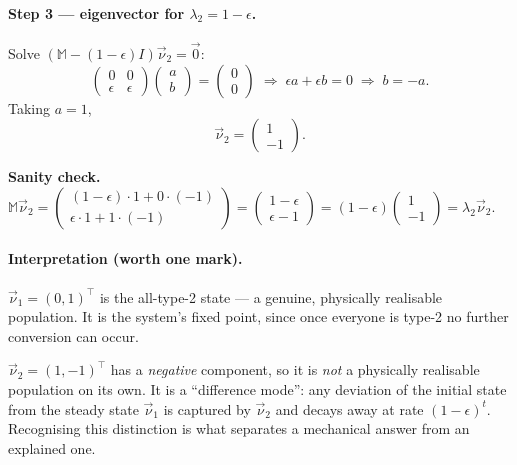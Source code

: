 \documentclass[12pt,a4paper]{article}
\newcommand{\M}{\mathbb{M}}
\newcommand{\vnu}{\vec{\nu}}
\begin{document}
\paragraph{Step 3 --- eigenvector for $\lambda_2 = 1-\epsilon$.} Solve $(\M - (1-\epsilon)I)\vnu_2 = \vec{0}$:
\[
\begin{pmatrix} 0 & 0 \\ \epsilon & \epsilon \end{pmatrix}\begin{pmatrix} a\\b \end{pmatrix} = \begin{pmatrix} 0\\0 \end{pmatrix}
\;\Longrightarrow\; \epsilon a + \epsilon b = 0 \;\Rightarrow\; b = -a.
\]
Taking $a=1$,
\[
\boxed{\vnu_2 = \begin{pmatrix} 1 \\ -1 \end{pmatrix}.}
\]
\begin{sanity}
\textbf{Sanity check.} $\M\vnu_2 = \begin{pmatrix} (1-\epsilon)\cdot 1 + 0\cdot(-1) \\ \epsilon\cdot 1 + 1\cdot(-1)\end{pmatrix} = \begin{pmatrix} 1-\epsilon\\ \epsilon-1\end{pmatrix} = (1-\epsilon)\begin{pmatrix} 1\\-1\end{pmatrix} = \lambda_2\vnu_2$. \checkmark
\end{sanity}

\paragraph{Interpretation (worth one mark).}
$\vnu_1 = (0,1)^{\top}$ is the all-type-2 state --- a genuine, physically realisable population. It is the system's fixed point, since once everyone is type-2 no further conversion can occur.

$\vnu_2 = (1,-1)^{\top}$ has a \emph{negative} component, so it is \emph{not} a physically realisable population on its own. It is a ``difference mode'': any deviation of the initial state from the steady state $\vnu_1$ is captured by $\vnu_2$ and decays away at rate $(1-\epsilon)^t$. Recognising this distinction is what separates a mechanical answer from an explained one.
\end{document}
